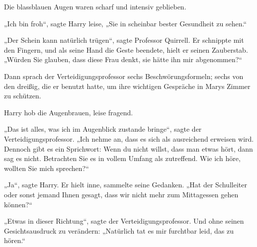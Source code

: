 Die blassblauen Augen waren scharf und intensiv geblieben.

„Ich bin froh“, sagte Harry leise, „Sie in scheinbar bester Gesundheit zu sehen.“

„Der Schein kann natürlich trügen“, sagte Professor Quirrell. Er schnippte mit den Fingern, und als seine Hand die Geste beendete, hielt er seinen Zauberstab. „Würden Sie glauben, dass diese Frau denkt, sie hätte ihn mir abgenommen?“

Dann sprach der Verteidigungsprofessor sechs Beschwörungsformeln; sechs von den dreißig, die er benutzt hatte, um ihre wichtigen Gespräche in Marys Zimmer zu schützen.

Harry hob die Augenbrauen, leise fragend.

„Das ist alles, was ich im Augenblick zustande bringe“, sagte der Verteidigungsprofessor. „Ich nehme an, dass es sich als ausreichend erweisen wird. Dennoch gibt es ein Sprichwort: Wenn du nicht willst, dass man etwas hört, dann sag es nicht. Betrachten Sie es in vollem Umfang als zutreffend. Wie ich höre, wollten Sie mich sprechen?“

„Ja“, sagte Harry. Er hielt inne, sammelte seine Gedanken. „Hat der Schulleiter oder sonst jemand Ihnen gesagt, dass wir nicht mehr zum Mittagessen gehen können?“

„Etwas in dieser Richtung“, sagte der Verteidigungsprofessor. Und ohne seinen Gesichtsausdruck zu verändern: „Natürlich tat es mir furchtbar leid, das zu hören.“

